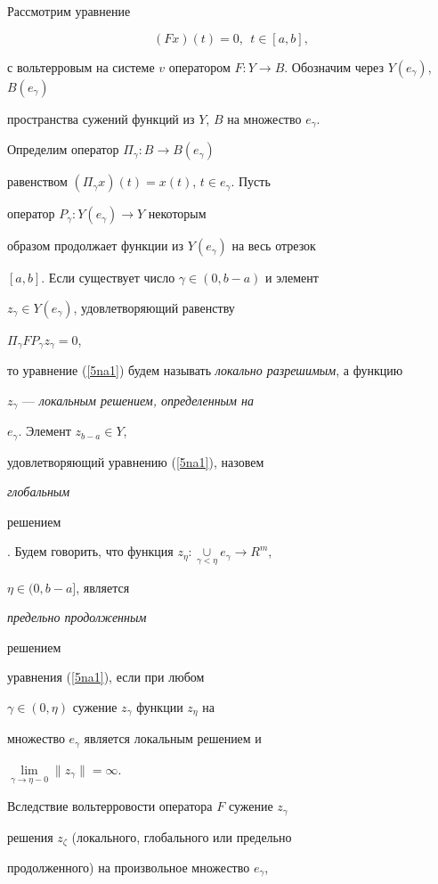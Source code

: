 Рассмотрим уравнение


\begin{equation} \label{5na1}


(F x)(t)=0,\ \ t\in [a, b],


\end{equation}


с вольтерровым на системе $v$ оператором $F:Y 


\to B$. Обозначим через $Y(e_\gamma)$, $B(e_\gamma)$


пространства сужений функций из $Y$, $B$ на множество $e_\gamma$. 


Определим оператор $\Pi_\gamma:B\to B(e_\gamma)$


равенством $(\Pi_\gamma x)(t)=x(t)$, $t\in e_\gamma$. Пусть


оператор $P_\gamma:Y(e_\gamma) \to Y$ некоторым


образом продолжает функции из $Y(e_\gamma)$ на весь отрезок


$[a, b]$. Если существует число $\gamma\in(0, b-a)$ и элемент


$z_\gamma \in Y(e_\gamma)$, удовлетворяющий равенству


$\Pi_\gamma F P_\gamma z_\gamma=0$,


то уравнение (\ref{5na1}) будем называть {\it локально разрешимым}, а функцию


$z_\gamma $ --- {\it локальным решением, определенным на}


$e_\gamma$. Элемент $z_{b-a} \in Y$,


удовлетворяющий уравнению (\ref{5na1}), назовем {\it глобальным


решением}. Будем говорить, что функция $z_\eta :


\mathop{\cup}\limits_{\gamma<\eta}e_\gamma \to R^m$,


$\eta\in(0, b-a]$, является {\it предельно продолженным


решением} уравнения (\ref{5na1}), если при любом


$\gamma\in (0, \eta)$ сужение $z_\gamma$ функции $z_\eta$ на


множество $e_\gamma$ является локальным решением и


$\lim\limits_{\gamma\to \eta-0} \|z_\gamma\|=\infty$.


Вследствие вольтерровости оператора $F$ сужение $z_\gamma$


решения $z_\zeta$ (локального, глобального или предельно


продолженного) на произвольное множество $e_\gamma$,


